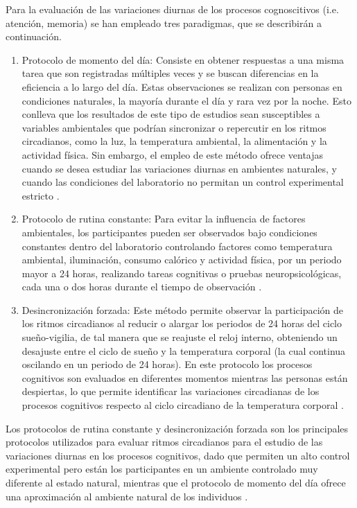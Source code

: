 \documentclass[12pt,letterpaper,final]{article}
\let\cite\cite %
\begin{document}
Para la evaluación de las variaciones diurnas de los procesos cognoscitivos (i.e. atención, memoria) se han empleado tres paradigmas, que se describirán a continuación.

\begin{enumerate}
	\item Protocolo de momento del día:
	Consiste en obtener respuestas a una misma tarea que son registradas múltiples veces y se buscan diferencias en la eficiencia a lo largo del día. Estas observaciones se realizan con personas en condiciones naturales, la mayoría durante el día y rara vez por la noche. Esto conlleva que los resultados de este tipo de estudios sean susceptibles a variables ambientales que podrían sincronizar o repercutir en los ritmos circadianos, como la luz, la temperatura ambiental,  la alimentación y la actividad física. Sin embargo, el empleo de este método ofrece ventajas cuando se desea estudiar las variaciones diurnas en ambientes naturales, y cuando las condiciones del laboratorio no permitan un control experimental estricto \cite{Blatter2007}.

	\item Protocolo de rutina constante:
	Para evitar la influencia de factores ambientales, los participantes pueden ser observados bajo condiciones constantes dentro del laboratorio controlando factores como temperatura ambiental, iluminación, consumo calórico y actividad física, por un periodo mayor a 24 horas, realizando tareas cognitivas o pruebas neuropsicológicas, cada una o dos horas durante el tiempo de observación \cite{Duffy2002}.

	\item Desincronización forzada:
	Este método permite observar la participación de los ritmos circadianos al reducir o alargar los periodos de 24 horas del ciclo sueño-vigilia, de tal manera que se reajuste el reloj interno, obteniendo un desajuste entre el ciclo de sueño y la temperatura corporal (la cual continua oscilando en un periodo de 24 horas). En este protocolo los procesos cognitivos son evaluados en diferentes momentos mientras las personas están despiertas, lo que permite identificar las variaciones circadianas de los procesos cognitivos respecto al ciclo circadiano de la temperatura corporal \cite{Hanneman2001}.
\end{enumerate}

Los protocolos de rutina constante y desincronización forzada son los principales protocolos utilizados para evaluar ritmos circadianos para el estudio de las variaciones diurnas en los procesos cognitivos, dado que permiten un alto   control experimental pero están los participantes en un ambiente controlado muy diferente al estado natural, mientras que el protocolo de momento del día ofrece una aproximación al ambiente natural  de los individuos \cite{Valdez2014}.
\end{document}
